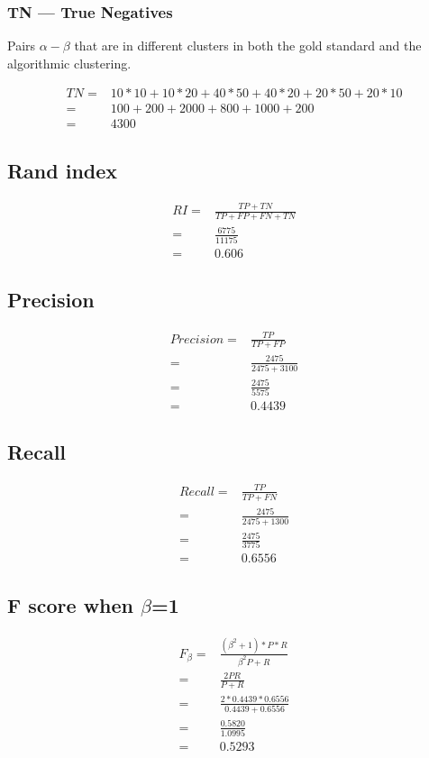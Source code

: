 \documentclass{article}
\begin{document}
\subsubsection{TN --- True Negatives}
Pairs $ \alpha -  \beta $ that are in different clusters in both the gold standard and the algorithmic clustering.

\begin{align*}
  TN =& 10*10 + 10*20 + 40*50 + 40*20 + 20*50 + 20*10 \\
  =& 100 + 200 + 2000 + 800 + 1000 + 200 \\
  =& 4300
\end{align*}

\subsection{Rand index}
\begin{align*}
  RI = & \frac{TP + TN}{TP + FP + FN + TN} \\
  =& \frac{6775}{11175} \\
  =& 0.606
\end{align*}

\subsection{Precision}
\begin{align*}
  Precision =& \frac{TP}{TP+FP} \\
  =& \frac{2475}{2475 + 3100}\\
  =& \frac{2475}{5575} \\
  =& 0.4439
\end{align*}

\subsection{Recall}
\begin{align*}
  Recall =& \frac{TP}{TP + FN} \\
  =& \frac{2475}{2475 + 1300} \\
  =& \frac{2475}{3775} \\
  =& 0.6556
\end{align*}

\subsection{F score when $\beta$=1}
\begin{align*}
  F_{\beta} =& \frac{(\beta^{2} + 1) * P * R}{\beta^{2}P + R} \\
  =& \frac{2PR}{P+R} \\
  =& \frac{2 * 0.4439 * 0.6556}{0.4439 + 0.6556} \\
  =& \frac{0.5820}{1.0995} \\
  =& 0.5293
\end{align*}
\end{document}
